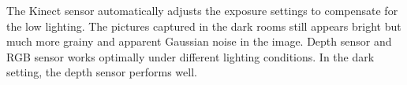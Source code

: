The Kinect sensor automatically adjusts the exposure settings to compensate for the low lighting. The pictures captured in the dark rooms still appears bright but much more grainy and apparent Gaussian noise in the image. Depth sensor and RGB sensor works optimally under different lighting conditions. In the dark setting, the depth sensor performs well. 


\begin{figure}
\centering
{}
\hfil
{}

\end{figure}
